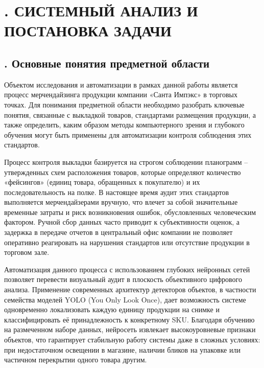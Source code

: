 \setcounter{chaptercntr}{1}

\sectionbreak \section*{
  \gostTitleFont
  \redline
  \thechaptercntr .
  СИСТЕМНЫЙ АНАЛИЗ И ПОСТАНОВКА ЗАДАЧИ
}

\titlespace

\subsection*{
  \gostTitleFont
  \redline
  \thechaptercntr .\thesubchaptercntr \spc
  Основные понятия предметной области
} \addtocounter{subchaptercntr}{1}

\subtitlespace

{\gostFont

  \par \redline Объектом исследования и автоматизации в рамках данной работы является процесс
  мерчендайзинга продукции компании «Санта Импэкс» в торговых точках.
  Для понимания предметной области необходимо разобрать ключевые понятия,
  связанные с выкладкой товаров, стандартами размещения продукции, а также
  определить, каким образом методы компьютерного зрения и глубокого обучения
  могут быть применены для автоматизации контроля соблюдения этих стандартов.

  \par \redline Процесс контроля выкладки базируется на строгом соблюдении планограмм {--} утвержденных схем расположения товаров, которые определяют количество «фейсингов» (единиц товара, обращенных к покупателю) и их последовательность на полке. В настоящее время аудит этих стандартов выполняется мерчендайзерами вручную, что влечет за собой значительные временные затраты и риск возникновения ошибок, обусловленных человеческим фактором. Ручной сбор данных часто приводит к субъективности оценок, а задержка в передаче отчетов в центральный офис компании не позволяет оперативно реагировать на нарушения стандартов или отсутствие продукции в торговом зале.

  \par \redline Автоматизация данного процесса с использованием глубоких нейронных сетей позволяет перевести визуальный аудит в плоскость объективного цифрового анализа. Применение современных архитектур детекторов объектов, в частности семейства моделей YOLO (You Only Look Once), дает возможность системе одновременно локализовать каждую единицу продукции на снимке и классифицировать её принадлежность к конкретному SKU. Благодаря обучению на размеченном наборе данных, нейросеть извлекает высокоуровневые признаки объектов, что гарантирует стабильную работу системы даже в сложных условиях: при недостаточном освещении в магазине, наличии бликов на упаковке или частичном перекрытии одного товара другим.

}
